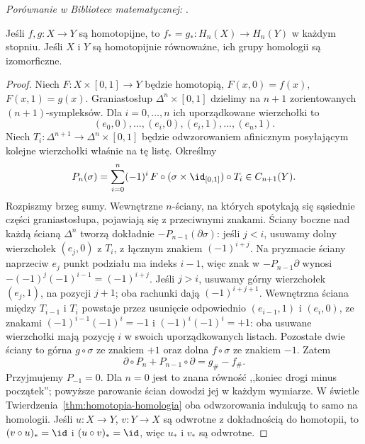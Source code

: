\noindent\emph{Porównanie w Bibliotece matematycznej:} .

\begin{twierdzenie}
\label{thm:homotopia-singularna}
Jeśli $f,g:X\to Y$ są homotopijne, to
$f_*=g_*:H_n(X)\to H_n(Y)$ w każdym stopniu.
Jeśli $X$ i $Y$ są homotopijnie równoważne,
ich grupy homologii są izomorficzne.
\end{twierdzenie}
\begin{proof}
Niech $F:X\times[0,1]\to Y$ będzie
homotopią, $F(x,0)=f(x)$,
$F(x,1)=g(x)$.
Graniastosłup $\Delta^n\times[0,1]$
dzielimy na $n+1$ zorientowanych
$(n+1)$-sympleksów. Dla $i=0,\ldots,n$
ich uporządkowane wierzchołki to
\[
 (e_0,0),\ldots,(e_i,0),
 (e_i,1),\ldots,(e_n,1).
\]
Niech $T_i:\Delta^{n+1}\to
\Delta^n\times[0,1]$ będzie odwzorowaniem
afinicznym posyłającym kolejne wierzchołki
właśnie na tę listę. Określmy
\[
 P_n(\sigma)=\sum_{i=0}^n(-1)^i\,
 F\circ(\sigma\times\id_{[0,1]})\circ T_i
 \in C_{n+1}(Y).
\]
Rozpiszmy brzeg sumy. Wewnętrzne
$n$-ściany, na których spotykają się
sąsiednie części graniastosłupa,
pojawiają się z przeciwnymi znakami.
Ściany boczne nad każdą ścianą
$\Delta^n$ tworzą dokładnie
$-P_{n-1}(\partial\sigma)$:
jeśli $j<i$, usuwamy dolny wierzchołek $(e_j,0)$
z $T_i$, z łącznym znakiem $(-1)^{i+j}$.
Na pryzmacie ściany naprzeciw $e_j$ punkt podziału ma indeks $i-1$,
więc znak w $-P_{n-1}\partial$ wynosi
$-(-1)^j(-1)^{i-1}=(-1)^{i+j}$.
Jeśli $j>i$, usuwamy górny wierzchołek $(e_j,1)$,
na pozycji $j+1$; oba rachunki dają $(-1)^{i+j+1}$.
Wewnętrzna ściana między $T_{i-1}$ i $T_i$ powstaje
przez usunięcie odpowiednio $(e_{i-1},1)$ i $(e_i,0)$,
ze znakami $(-1)^{i-1}(-1)^i=-1$ i
$(-1)^i(-1)^i=+1$: oba usuwane wierzchołki
mają pozycję $i$ w swoich uporządkowanych listach.
Pozostałe dwie ściany to górna
$g\circ\sigma$ ze znakiem $+1$
oraz dolna $f\circ\sigma$ ze
znakiem $-1$. Zatem
\begin{equation}\label{eq:prism-identity}
 \partial\circ P_n+P_{n-1}\circ\partial
 =g_\#-f_\#.
\end{equation}
Przyjmujemy $P_{-1}=0$. Dla $n=0$ jest to znana równość
,,koniec drogi minus początek'';
powyższe parowanie ścian dowodzi
jej w każdym wymiarze. W świetle
Twierdzenia~\ref{thm:homotopia-homologia}
oba odwzorowania indukują to samo na homologii.
Jeśli $u:X\to Y$, $v:Y\to X$
są odwrotne z dokładnością do homotopii,
to $(v\circ u)_*=\id$ i $(u\circ v)_*=\id$,
więc $u_*$ i $v_*$ są odwrotne.
\end{proof}

